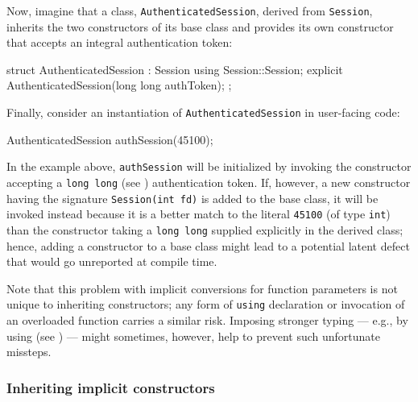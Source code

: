 \noindent Now, imagine that a class, \lstinline!AuthenticatedSession!, derived from
\lstinline!Session!, inherits the two constructors of its base class and provides its own constructor that accepts an integral
authentication token:

\begin{emcppslisting}[emcppsbatch=e9]
struct AuthenticatedSession : Session
{
    using Session::Session;
    explicit AuthenticatedSession(long long authToken);
};
\end{emcppslisting}

\noindent Finally, consider an instantiation of \lstinline!AuthenticatedSession! in
user-facing code:

\begin{emcppslisting}[emcppsbatch=e9]
AuthenticatedSession authSession(45100);
\end{emcppslisting}

\noindent In the example above, \lstinline!authSession! will be initialized by
invoking the constructor accepting a \lstinline!long!~\lstinline!long! (see )
authentication token. If, however, a new
constructor having the signature \lstinline!Session(int!~\lstinline!fd)! is added to the
base class, it will be invoked instead because it is a better match to the
literal \lstinline!45100! (of type \lstinline!int!) than the constructor
taking a \lstinline!long!~\lstinline!long! supplied explicitly in the derived
class; hence, adding a constructor to a base class might lead to a
potential latent defect that would go unreported at compile
time.

Note that this problem with implicit conversions for function parameters is not unique
to inheriting constructors; any form of \lstinline!using! declaration or
invocation of an overloaded function carries a similar risk. Imposing
stronger typing --- e.g., by using  (see )
--- might sometimes, however, help to prevent such
unfortunate missteps.

\subsubsection[Inheriting \emph{implicit} constructors]{Inheriting {\sfbsubsubsecitalRomeo implicit} constructors}\label{beware-of-inheriting-implicit-constructors}

